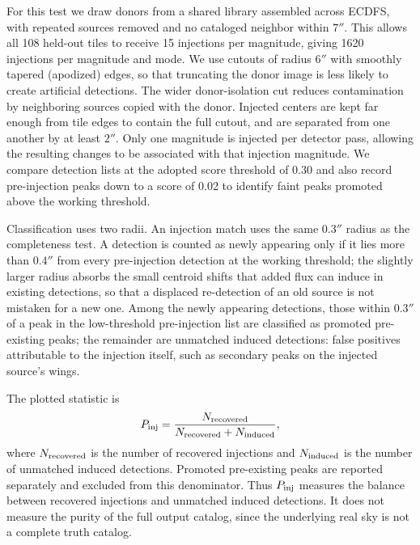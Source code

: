 \documentclass[twocolumn,linenumbers]{aastex701}
\begin{document}
For this test we draw donors from a shared library assembled across ECDFS, with repeated sources removed and no cataloged neighbor within $7''$. This allows all 108 held-out tiles to receive 15 injections per magnitude, giving 1620 injections per magnitude and mode. We use cutouts of radius $6''$ with smoothly tapered (apodized) edges, so that truncating the donor image is less likely to create artificial detections. The wider donor-isolation cut reduces contamination by neighboring sources copied with the donor. Injected centers are kept far enough from tile edges to contain the full cutout, and are separated from one another by at least $2''$. Only one magnitude is injected per detector pass, allowing the resulting changes to be associated with that injection magnitude. We compare detection lists at the adopted score threshold of 0.30 and also record pre-injection peaks down to a score of 0.02 to identify faint peaks promoted above the working threshold.

Classification uses two radii. An injection match uses the same $0.3''$ radius as the completeness test. A detection is counted as newly appearing only if it lies more than $0.4''$ from every pre-injection detection at the working threshold; the slightly larger radius absorbs the small centroid shifts that added flux can induce in existing detections, so that a displaced re-detection of an old source is not mistaken for a new one. Among the newly appearing detections, those within $0.3''$ of a peak in the low-threshold pre-injection list are classified as promoted pre-existing peaks; the remainder are unmatched induced detections: false positives attributable to the injection itself, such as secondary peaks on the injected source's wings.

The plotted statistic is
\begin{equation}
P_{\rm inj}=\frac{N_{\rm recovered}}{N_{\rm recovered}+N_{\rm induced}},
\label{eq:injection_purity}
\end{equation}
where $N_{\rm recovered}$ is the number of recovered injections and $N_{\rm induced}$ is the number of unmatched induced detections. Promoted pre-existing peaks are reported separately and excluded from this denominator. Thus $P_{\rm inj}$ measures the balance between recovered injections and unmatched induced detections. It does not measure the purity of the full output catalog, since the underlying real sky is not a complete truth catalog.
\end{document}
